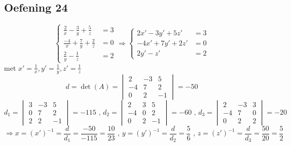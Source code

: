 \documentclass[lineaire_algebra_oplossingen.tex]{subfiles}
\begin{document}
\subsection{Oefening 24}
\[ \left\{
     \begin{array}{lr}
       \frac{2}{x}-\frac{3}{y}+\frac{5}{z} &= 3 \\
       \frac{-4}{x}+\frac{7}{y}+\frac{2}{z} &= 0 \\
       \frac{2}{y}-\frac{1}{z} &= 2
     \end{array}
   \right. \Longrightarrow\left\{
     \begin{array}{lr}
       2x'-3y'+5z' &= 3 \\
       -4x'+7y'+2z' &= 0 \\
       2y'-z' &= 2
     \end{array}
   \right.
\]
met $x' = \frac{1}{x}, y' = \frac{1}{y}, z' = \frac{1}{z}$
\[  d = \det(A) = \begin{vmatrix}
            2 & -3 & 5\\
            -4 & 7 & 2\\
            0 & 2 & -1
    \end{vmatrix} = -50\]
\[  d_1 = \begin{vmatrix}
        3 & -3 & 5\\
        0 & 7 & 2\\
        2 & 2 & -1
    \end{vmatrix} = -115 \text{ , }
    d_2 = \begin{vmatrix}
        2 & 3 & 5\\
        -4 & 0 & 2\\
        0 & 2 & -1
    \end{vmatrix} = -60 \text{ , }
    d_3 = \begin{vmatrix}
        2 & -3 & 3\\
        -4 & 7 & 0\\
        0 & 2 & 2
    \end{vmatrix} = -20
\]
\[\Longrightarrow x = (x')^{-1}= \frac{d}{d_1} = \frac{-50}{-115} = \frac{10}{23} \text{ , }
    y = (y')^{-1}= \frac{d}{d_2} = \frac{5}{6} \text{ , }
    z = (z')^{-1}= \frac{d}{d_3} = \frac{50}{20} = \frac{5}{2}
\]
\end{document}
